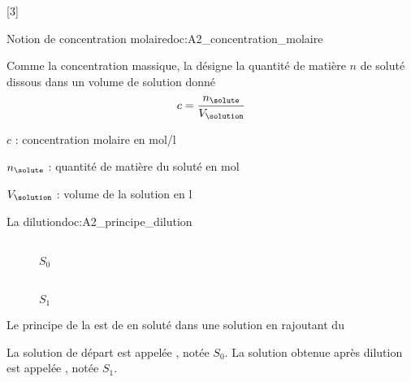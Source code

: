 [3]


\begin{doc}{Notion de concentration molaire}{doc:A2_concentration_molaire}  
  \begin{importants}
    Comme la concentration massique, la  désigne la quantité de matière $n$ de soluté dissous dans un volume de solution donné
    \begin{equation*}
      c = \dfrac{n_\solute}{V_\solution}
    \end{equation*}
  \end{importants}
  \begin{listePoints}
    \item $c$ : concentration molaire en \unit{\mole/\litre}
    \item $n_\solute$ : quantité de matière du soluté en \unit{\mole}
    \item $V_\solution$ : volume de la solution en \unit{\litre}
  \end{listePoints}
\end{doc}


\newpage
\vspace*{-36pt}
\begin{doc}{La dilution}{doc:A2_principe_dilution}
  \begin{wrapfigure}[5]{r}{0.5\linewidth}
    \vspace*{-30pt}
    \centering
    \begin{multicols}{4}
     \\[-0pt]
    \footnotesize{$S_0$}
    
    
    
     \\[-0pt]
    \footnotesize{$S_1$}
    \end{multicols}
  \end{wrapfigure}
  \vAligne{-40pt}
  
  \begin{importants}
    Le principe de la  est de  en soluté dans une solution en rajoutant du 
  \end{importants}
  La solution de départ est appelée , notée $S_0$.
  La solution obtenue après dilution est appelée , notée $S_1$.
\end{doc}

